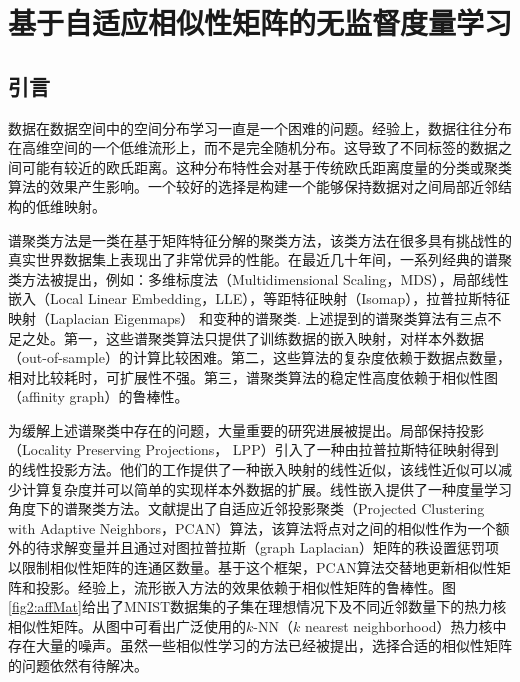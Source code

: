 \chapter{基于自适应相似性矩阵的无监督度量学习}
\section{引言}
数据在数据空间中的空间分布学习一直是一个困难的问题。经验上，数据往往分布在高维空间的一个低维流形上，而不是完全随机分布。这导致了不同标签的数据之间可能有较近的欧氏距离。这种分布特性会对基于传统欧氏距离度量的分类或聚类算法的效果产生影响。一个较好的选择是构建一个能够保持数据对之间局部近邻结构的低维映射。

谱聚类方法是一类在基于矩阵特征分解的聚类方法，该类方法在很多具有挑战性的真实世界数据集上表现出了非常优异的性能。在最近几十年间，一系列经典的谱聚类方法被提出，例如：多维标度法（Multidimensional Scaling，MDS）\cite{cox2000multidimensional}，局部线性嵌入（Local Linear Embedding，LLE）\cite{roweis2000nonlinear}，等距特征映射（Isomap）\cite{tenenbaum2000global}，拉普拉斯特征映射（Laplacian Eigenmaps）  \cite{belkin2001laplacian}和变种的谱聚类\cite{ng2002spectral}. 上述提到的谱聚类算法有三点不足之处。第一，这些谱聚类算法只提供了训练数据的嵌入映射，对样本外数据（out-of-sample）的计算比较困难。第二，这些算法的复杂度依赖于数据点数量，相对比较耗时，可扩展性不强。第三，谱聚类算法的稳定性高度依赖于相似性图（affinity graph）的鲁棒性。

为缓解上述谱聚类中存在的问题，大量重要的研究进展被提出\cite{bengio2004out,niyogi2004locality,fowlkes2004spectral,yan2009fast,chen2011large,pavan2007dominant,premachandran2013consensus,zhu2014constructing,nie2014clustering}。局部保持投影（Locality Preserving Projections， LPP）\cite{niyogi2004locality}引入了一种由拉普拉斯特征映射得到的线性投影方法。他们的工作提供了一种嵌入映射的线性近似，该线性近似可以减少计算复杂度并可以简单的实现样本外数据的扩展。线性嵌入提供了一种度量学习角度下的谱聚类方法。文献\parencite{nie2014clustering}提出了自适应近邻投影聚类（Projected Clustering with Adaptive Neighbors，PCAN）算法，该算法将点对之间的相似性作为一个额外的待求解变量并且通过对图拉普拉斯（graph Laplacian）矩阵的秩设置惩罚项以限制相似性矩阵的连通区数量。基于这个框架，PCAN算法交替地更新相似性矩阵和投影。经验上，流形嵌入方法的效果依赖于相似性矩阵的鲁棒性。图\ref{fig2:affMat}给出了MNIST数据集\cite{lecun1998gradient}的子集在理想情况下及不同近邻数量下的热力核相似性矩阵。从图中可看出广泛使用的$k$-NN（$k$ nearest neighborhood）热力核中存在大量的噪声。虽然一些相似性学习的方法已经被提出，选择合适的相似性矩阵的问题依然有待解决。

